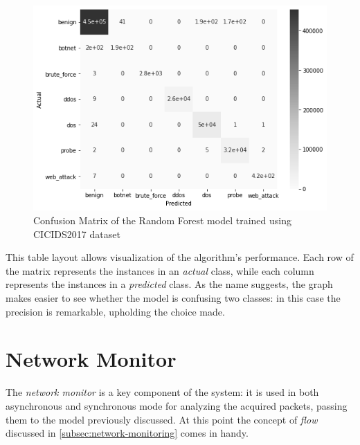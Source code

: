 \begin{figure}[h!]
   \centering
   \includegraphics[scale=0.65]{assets/figures/chapter3/confusion_matrix.png}
   \caption{Confusion Matrix of the Random Forest model trained using CICIDS2017 dataset}
   \label{fig:confusion-matrix}
\end{figure}

\noindent This table layout allows visualization of the algorithm's performance. Each row of the matrix represents the instances in an \textit{actual} class, while each column represents the instances in a \textit{predicted} class. As the name suggests, the graph makes easier to see whether the model is confusing two classes: in this case the precision is remarkable, upholding the choice made.


\section{Network Monitor}
\label{sec:monitor-implementation}

The \textit{network monitor} is a key component of the system: it is used in both asynchronous and synchronous mode for analyzing the acquired packets, passing them to the model previously discussed. At this point the concept of \textit{flow} discussed in \ref{subsec:network-monitoring} comes in handy.


